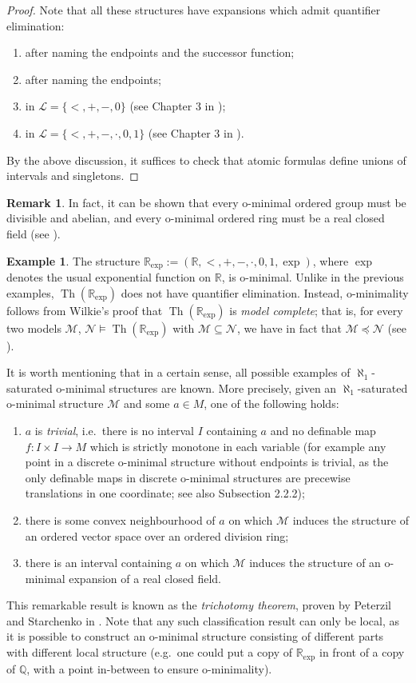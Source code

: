 \documentclass[a4paper]{report}
\newcommand{\ind}{\hspace{15pt}}
\newcommand{\R}{\mathbb{R}}
\newcommand{\Q}{\mathbb{Q}}
\renewcommand{\L}{\mathcal{L}}
\newcommand{\M}{\mathcal{M}}
\newcommand{\N}{\mathcal{N}}
\DeclareMathOperator{\Th}{Th}
\theoremstyle{definition}
\newtheorem{exmp}[thm]{Example}
\theoremstyle{remstyle}
\newtheorem{rem}[thm]{Remark}
\begin{document}
\begin{proof}
	Note that all these structures have expansions which admit quantifier elimination:
	\begin{enumerate}
		\item after naming the endpoints and the successor function;
		\item after naming the endpoints;
		\item in $\L=\{<,+,-,0\}$ (see Chapter 3 in \cite{mt intro});
		\item in $\L=\{<,+,-,\cdot,0,1\}$ (see Chapter 3 in \cite{mt intro}).
	\end{enumerate}
	By the above discussion, it suffices to check that atomic formulas define unions of intervals and singletons.
\end{proof}

\begin{rem}
	In fact, it can be shown that every o-minimal ordered group must be divisible and abelian, and every o-minimal ordered ring must be a real closed field (see \cite{defI}).
\end{rem}

\begin{exmp}
	The structure $\R_{\exp}:=(\R,<,+,-,\cdot,0,1,\exp)$, where $\exp$ denotes the usual exponential function on $\R$, is o-minimal. Unlike in the previous examples, $\Th(\R_{\exp})$ does not have quantifier elimination. Instead, o-minimality follows from Wilkie's proof that $\Th(\R_{\exp})$ is \emph{model complete}; that is, for every two models $\M$, $\N\models\Th(\R_{\exp})$ with $\M\subseteq\N$, we have in fact that $\M\preceq\N$ (see \cite{wilkie}).
\end{exmp}

\ind It is worth mentioning that in a certain sense, all possible examples of $\aleph_1$-saturated o-minimal structures are known. More precisely, given an $\aleph_1$-saturated o-minimal structure $\M$ and some $a\in M$, one of the following holds:
\begin{enumerate}
	\item $a$ is \emph{trivial}, i.e.\ there is no interval $I$ containing $a$ and no definable map $f:I\times I\to M$ which is strictly monotone in each variable (for example any point in a discrete o-minimal structure without endpoints is trivial, as the only definable maps in discrete o-minimal structures are precewise translations in one coordinate; see also Subsection 2.2.2);
	\item there is some convex neighbourhood of $a$ on which $\M$ induces the structure of an ordered vector space over an ordered division ring;
	\item there is an interval containing $a$ on which $\M$ induces the structure of an o-minimal expansion of a real closed field.
\end{enumerate}
This remarkable result is known as the \emph{trichotomy theorem}, proven by Peterzil and Starchenko in \cite{trichotomy}. Note that any such classification result can only be local, as it is possible to construct an o-minimal structure consisting of different parts with different local structure (e.g.\ one could put a copy of $\R_{\exp}$ in front of a copy of $\Q$, with a point in-between to ensure o-minimality).
\end{document}
